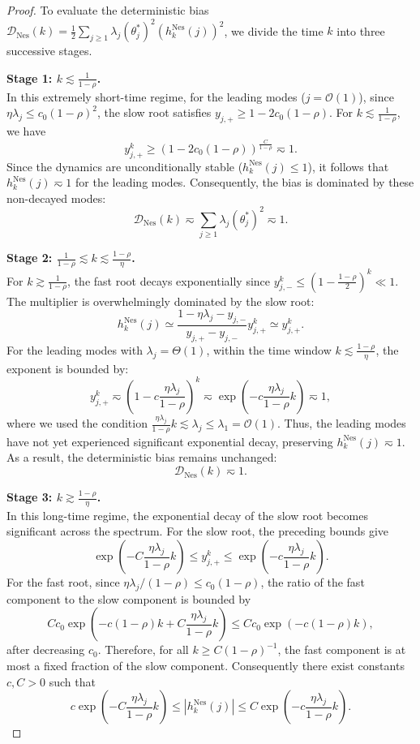 \begin{proof}
To evaluate the deterministic bias $\mathcal{D}_{\mathrm{Nes}}(k) = \frac12\sum_{j\ge1}\lambda_j(\theta_j^*)^2 \left(h_k^{\mathrm{Nes}}(j)\right)^2$, we divide the time $k$ into three successive stages.

\textbf{Stage 1: $k \lesssim \frac{1}{1-\rho}$.} \\
In this extremely short-time regime, for the leading modes ($j=\mathcal{O}(1)$), since $\eta\lambda_j \le c_0(1-\rho)^2$, the slow root satisfies $y_{j,+} \ge 1 - 2c_0(1-\rho)$. For $k \lesssim \frac{1}{1-\rho}$, we have
\[
    y_{j,+}^k \ge \left(1 - 2c_0(1-\rho)\right)^{\frac{C}{1-\rho}} \eqsim 1.
\]
Since the dynamics are unconditionally stable ($h_k^{\mathrm{Nes}}(j) \le 1$), it follows that $h_k^{\mathrm{Nes}}(j) \eqsim 1$ for the leading modes. Consequently, the bias is dominated by these non-decayed modes:
\[
    \mathcal{D}_{\mathrm{Nes}}(k) \eqsim \sum_{j\ge1}\lambda_j(\theta_j^*)^2 \eqsim 1.
\]

\textbf{Stage 2: $\frac{1}{1-\rho} \lesssim k \lesssim \frac{1-\rho}{\eta}$.} \\
For $k \gtrsim \frac{1}{1-\rho}$, the fast root decays exponentially since $y_{j,-}^k \le \left(1-\frac{1-\rho}{2}\right)^k \ll 1$. The multiplier is overwhelmingly dominated by the slow root:
\[
    h_k^{\mathrm{Nes}}(j) \simeq \frac{1-\eta\lambda_j - y_{j,-}}{y_{j,+} - y_{j,-}} y_{j,+}^k \simeq y_{j,+}^k.
\]
For the leading modes with $\lambda_j = \Theta(1)$, within the time window $k \lesssim \frac{1-\rho}{\eta}$, the exponent is bounded by:
\[
    y_{j,+}^k \eqsim \left(1 - c\frac{\eta\lambda_j}{1-\rho}\right)^k \eqsim \exp\left(-c\frac{\eta\lambda_j}{1-\rho}k\right) \eqsim 1,
\]
where we used the condition $\frac{\eta\lambda_j}{1-\rho}k \lesssim \lambda_j \le \lambda_1 = \mathcal{O}(1)$. Thus, the leading modes have not yet experienced significant exponential decay, preserving $h_k^{\mathrm{Nes}}(j) \eqsim 1$. As a result, the deterministic bias remains unchanged:
\[
    \mathcal{D}_{\mathrm{Nes}}(k) \eqsim 1.
\]

\textbf{Stage 3: $k \gtrsim \frac{1-\rho}{\eta}$.} \\
In this long-time regime, the exponential decay of the slow root becomes significant across the spectrum. For the slow root, the preceding bounds give
\[
    \exp\left(-C\frac{\eta\lambda_j}{1-\rho}k\right)
    \le
    y_{j,+}^{k}
    \le
    \exp\left(-c\frac{\eta\lambda_j}{1-\rho}k\right).
\]
For the fast root, since \(\eta\lambda_j/(1-\rho)\le c_0(1-\rho)\), the ratio of the fast component to the slow component is bounded by
\[
    Cc_0
    \exp\left(-c(1-\rho)k+C\frac{\eta\lambda_j}{1-\rho}k\right)
    \le
    Cc_0\exp\left(-c(1-\rho)k\right),
\]
after decreasing \(c_0\).  Therefore, for all \(k\ge C(1-\rho)^{-1}\), the fast component is at most a fixed fraction of the slow component.  Consequently there exist constants \(c,C>0\) such that
\[
    c\exp\left(-C\frac{\eta\lambda_j}{1-\rho}k\right)
    \le
    \left|h_k^{\mathrm{Nes}}(j)\right|
    \le
    C\exp\left(-c\frac{\eta\lambda_j}{1-\rho}k\right).
\]


\end{proof}
